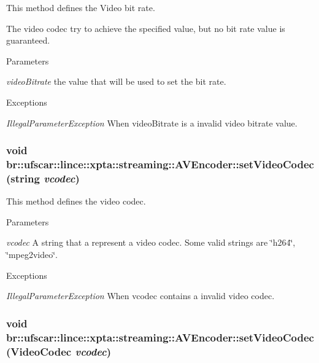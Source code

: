 This method defines the Video bit rate. 

The video codec try to achieve the specified value, but no bit rate value is guaranteed. 
\begin{DoxyParams}{Parameters}
\item[{\em videoBitrate}]the value that will be used to set the bit rate. \end{DoxyParams}

\begin{DoxyExceptions}{Exceptions}
\item[{\em IllegalParameterException}]When videoBitrate is a invalid video bitrate value. \end{DoxyExceptions}
\hypertarget{classbr_1_1ufscar_1_1lince_1_1xpta_1_1streaming_1_1AVEncoder_aa70cdaa8e4298f3109fd494460a877fc}{
\subsubsection[{setVideoCodec}]{\setlength{\rightskip}{0pt plus 5cm}void br::ufscar::lince::xpta::streaming::AVEncoder::setVideoCodec (string {\em vcodec})}}
\label{classbr_1_1ufscar_1_1lince_1_1xpta_1_1streaming_1_1AVEncoder_aa70cdaa8e4298f3109fd494460a877fc}


This method defines the video codec. 


\begin{DoxyParams}{Parameters}
\item[{\em vcodec}]A string that a represent a video codec. Some valid strings are \char`\"{}h264\char`\"{}, \char`\"{}mpeg2video\char`\"{}. \end{DoxyParams}

\begin{DoxyExceptions}{Exceptions}
\item[{\em IllegalParameterException}]When vcodec contains a invalid video codec. \end{DoxyExceptions}
\hypertarget{classbr_1_1ufscar_1_1lince_1_1xpta_1_1streaming_1_1AVEncoder_a0b9d042b6ae7ef9aee384d311e4a773d}{
\subsubsection[{setVideoCodec}]{\setlength{\rightskip}{0pt plus 5cm}void br::ufscar::lince::xpta::streaming::AVEncoder::setVideoCodec ({\bf VideoCodec} {\em vcodec})}}
\label{classbr_1_1ufscar_1_1lince_1_1xpta_1_1streaming_1_1AVEncoder_a0b9d042b6ae7ef9aee384d311e4a773d}


